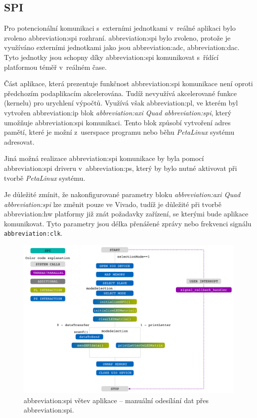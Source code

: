 \documentclass[a4paper, twoside, 11pt]{article}
\newcommand{\fbar}{\FloatBarrier}
\begin{document}
	   \fbar
	   \subsection{SPI}\label{subsec:spi}
	   Pro potencionální komunikaci s~externími jednotkami v~reálné aplikaci bylo zvoleno \gls{abbreviation:spi} rozhraní. \gls{abbreviation:spi} bylo zvoleno, protože je využíváno externími jednotkami jako jsou \gls{abbreviation:adc}, \gls{abbreviation:dac}. Tyto jednotky jsou schopny díky \gls{abbreviation:spi} komunikovat s~řídící platformou téměř v~reálném čase.\par
	   Část aplikace, která prezentuje funkčnost \gls{abbreviation:spi} komunikace není oproti předchozím podaplikacím akcelerována. Tudíž nevyužívá akcelerované funkce (kernelu) pro urychlení výpočtů. Využívá však \gls{abbreviation:pl}, ve kterém byl vytvořen \gls{abbreviation:ip} blok \textit{\gls{abbreviation:axi} Quad \gls{abbreviation:spi}}, který umožňuje \gls{abbreviation:spi} komunikaci. Tento blok způsobí vytvoření adres pamětí, které je možní z~userspace programu nebo běhu \textit{PetaLinux} systému adresovat.\par
	   Jiná možná realizace \gls{abbreviation:spi} komunikace by byla pomocí \gls{abbreviation:spi} driveru v~\gls{abbreviation:ps}, který by bylo nutné aktivovat při tvorbě \textit{PetaLinux} systému.\par
	   Je důležité zmínit, že nakonfigurované parametry bloku \textit{\gls{abbreviation:axi} Quad \gls{abbreviation:spi}} lze změnit pouze ve Vivado, tudíž je důležité při tvorbě \gls{abbreviation:hw} platformy již znát požadavky zařízení, se kterými bude aplikace komunikovat. Tyto parametry jsou délka přenášené zprávy nebo frekvenci signálu \texttt{\gls{abbreviation:clk}}.\par
	   
	   \begin{figure}[htbp!]
			\centering
			\includegraphics[width=1\textwidth]{src/pdf/spi.pdf}
			\caption{\gls{abbreviation:spi} větev aplikace – manuální odesílání dat přes \gls{abbreviation:spi}.}
			\label{fig:spi}
	\end{figure}
\end{document}
